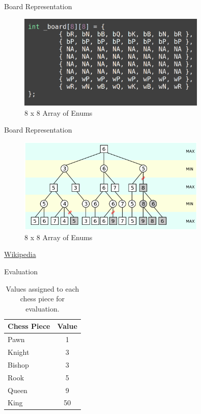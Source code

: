 \documentclass{beamer}
\begin{document}
\begin{frame}{Board Representation}
    \begin{figure}
        \centering
        \includegraphics[width=0.8\textwidth]{board_representation.png} %
        \caption{8 x 8 Array of Enums}
    \end{figure}
\end{frame}




\begin{frame}{Board Representation}
    \begin{figure}
        \centering
        \includegraphics[width=0.8\textwidth]{minimax.png} %

        \caption{8 x 8 Array of Enums}
    \end{figure}
\href{https://en.wikipedia.org/wiki/Alpha\%E2\%80\%93beta_pruning}{Wikipedia}
\end{frame}





\begin{frame}{Evaluation}
\begin{table}[ht]
\centering
\begin{tabular}{|l|c|}
\hline
\textbf{Chess Piece} & \textbf{Value} \\
\hline
Pawn & 1 \\
\hline
Knight & 3 \\
\hline
Bishop & 3 \\
\hline
Rook & 5 \\
\hline
Queen & 9 \\
\hline
King & 50 \\
\hline
\end{tabular}
\caption{Values assigned to each chess piece for evaluation.}
\label{table:chess_piece_values}
\end{table}
\end{frame}
\end{document}
